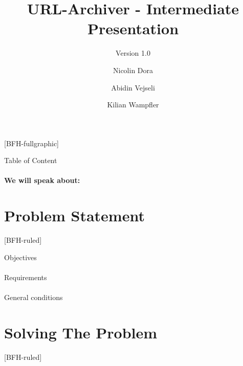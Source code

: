 \documentclass[
    ngerman,%
    authorontitle=true,
]{bfhbeamer}
\title{URL-Archiver - Intermediate Presentation}
\subtitle{Version 1.0}
\author[N. Dora \and A. Vejseli \and K. Wampfler]{Nicolin Dora \and Abidin Vejseli \and Kilian Wampfler}
\institute{IT}
\begin{document}

    [BFH-fullgraphic]
    \maketitle



    \begin{frame}{Table of Content}
        \framesubtitle{We will speak about:}
        \tableofcontents
    \end{frame}

    \section{Problem Statement}
    [BFH-ruled]
    \frame{\sectionpage}

    \begin{frame}{Objectives}
        \framesubtitle{}
    \end{frame}

    \begin{frame}{Requirements}
        \framesubtitle{}

    \end{frame}

    \begin{frame}{General conditions}
        \framesubtitle{}
    \end{frame}

    \section{Solving The Problem}
    [BFH-ruled]
    \frame{\sectionpage}
\end{document}
